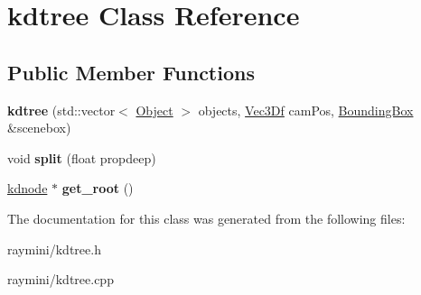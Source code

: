 \hypertarget{classkdtree}{
\section{kdtree Class Reference}
\label{classkdtree}
}
\subsection*{Public Member Functions}
\begin{DoxyCompactItemize}
\item 
\hypertarget{classkdtree_a38aacc294beed5947ad5e668da4b92a8}{
{\bfseries kdtree} (std::vector$<$ \hyperlink{class_object}{Object} $>$ objects, \hyperlink{class_vec3_d}{Vec3Df} camPos, \hyperlink{class_bounding_box}{BoundingBox} \&scenebox)}
\label{classkdtree_a38aacc294beed5947ad5e668da4b92a8}

\item 
\hypertarget{classkdtree_a05ea05935fe6595da4be7ee3e90bd99b}{
void {\bfseries split} (float propdeep)}
\label{classkdtree_a05ea05935fe6595da4be7ee3e90bd99b}

\item 
\hypertarget{classkdtree_a7e7fbee37714c8110147cd49fe8d0d68}{
\hyperlink{classkdnode}{kdnode} $\ast$ {\bfseries get\_\-root} ()}
\label{classkdtree_a7e7fbee37714c8110147cd49fe8d0d68}

\end{DoxyCompactItemize}


The documentation for this class was generated from the following files:\begin{DoxyCompactItemize}
\item 
raymini/kdtree.h\item 
raymini/kdtree.cpp\end{DoxyCompactItemize}
